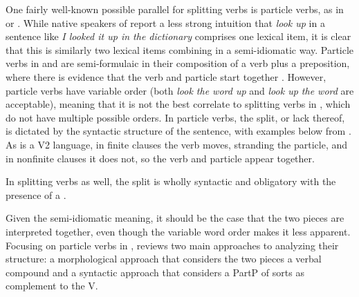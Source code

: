 \documentclass[output=paper]{LSP/langsci}
\begin{document}
One fairly well-known possible parallel for splitting verbs is particle verbs, as in  or . While native speakers of  report a less strong intuition that \textit{look up} in a sentence like \textit{I looked it up in the dictionary} comprises one lexical item, it is clear that this is similarly two lexical items combining in a semi-idiomatic way. Particle verbs in  and  are semi-formulaic in their composition of a verb plus a preposition, where there is evidence that the verb and particle start together \citep{Johnson1991}. However,  particle verbs have variable order (both \textit{look the word up} and \textit{look up the word} are acceptable), meaning that it is not the best correlate to splitting verbs in , which do not have multiple possible orders. In  particle verbs, the split, or lack thereof, is dictated by the syntactic structure of the sentence, with examples below from \citet{Zeller2001}. As  is a V2 language, in finite clauses the verb moves, stranding the particle, and in nonfinite clauses it does not, so the verb and particle appear together.

\ea
 \z \label{german}
\z


In  splitting verbs as well, the split is wholly syntactic and obligatory with the presence of a . 

Given the semi-idiomatic meaning, it should be the case that the two pieces are interpreted together, even though the variable word order makes it less apparent. Focusing on particle verbs in , \citet{Zeller2001} reviews two main approaches to analyzing their structure: a morphological approach that considers the two pieces a verbal compound and a syntactic approach that considers a PartP of sorts as complement to the V. 
\end{document}
